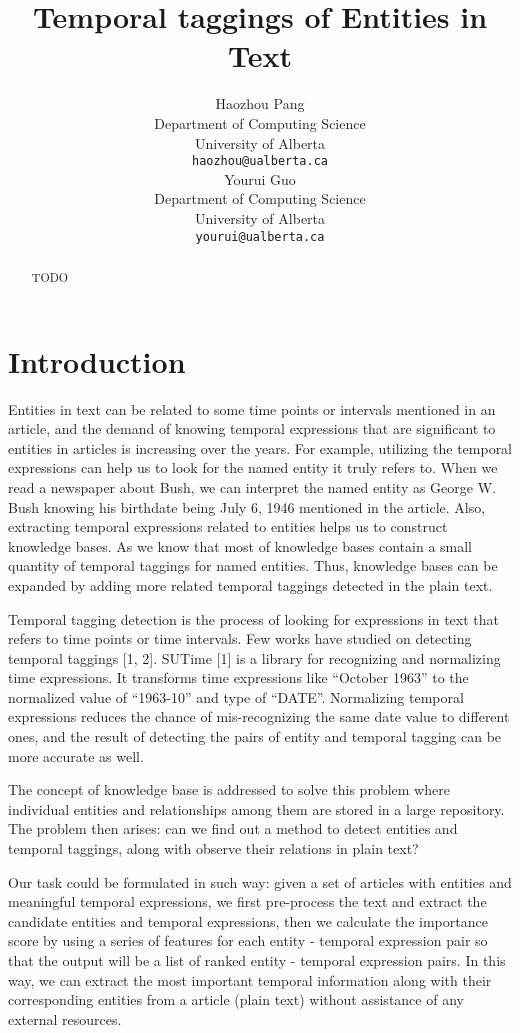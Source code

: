 \documentclass[11pt,a4paper]{article}
\title{Temporal taggings of Entities in Text }
\author{Haozhou Pang \\
  Department of Computing Science \\
  University of Alberta\\
  {\tt haozhou@ualberta.ca} \\\And
 Yourui Guo\\
  Department of Computing Science \\
  University of Alberta\\
  {\tt yourui@ualberta.ca} \\}
\date{}
\begin{document}
\maketitle

\begin{abstract}
TODO

\end{abstract}


\section{Introduction}
 Entities in text can be related to some time points or intervals mentioned in an article, and the demand of knowing temporal expressions that are significant to entities in articles is increasing over the years. For example, utilizing the temporal expressions can help us to look for the named entity it truly refers to. When we read a newspaper about Bush, we can interpret the named entity as George W. Bush knowing his birthdate being July 6, 1946 mentioned in the article. Also, extracting temporal expressions related to entities helps us to construct knowledge bases. As we know that most of knowledge bases contain a small quantity of temporal taggings for named entities. Thus, knowledge bases can be expanded by adding more related temporal taggings detected in the plain text.

Temporal tagging detection is the process of looking for expressions in text that refers to time points or time intervals. Few works have studied on detecting temporal taggings [1, 2]. SUTime [1] is a library for recognizing and normalizing time expressions. It transforms time expressions like “October 1963” to the normalized value of “1963-10” and type of “DATE”. Normalizing temporal expressions reduces the chance of mis-recognizing the same date value to different ones, and the result of detecting the pairs of entity and temporal tagging can be more accurate as well.

The concept of knowledge base is addressed to solve this problem where individual entities and relationships among them are stored in a large repository. The problem then arises: can we find out a method to detect entities and temporal taggings, along with observe their relations in plain text? 

Our task could be formulated in such way: given a set of articles with entities and meaningful temporal expressions, we first pre-process the text and extract the candidate entities and temporal expressions, then we calculate the importance score by using a series of features for each entity - temporal expression pair so that the output will be a list of ranked entity - temporal expression pairs. In this way, we can extract the most important temporal information along with their corresponding entities from a article (plain text) without assistance of any external resources.
\end{document}
